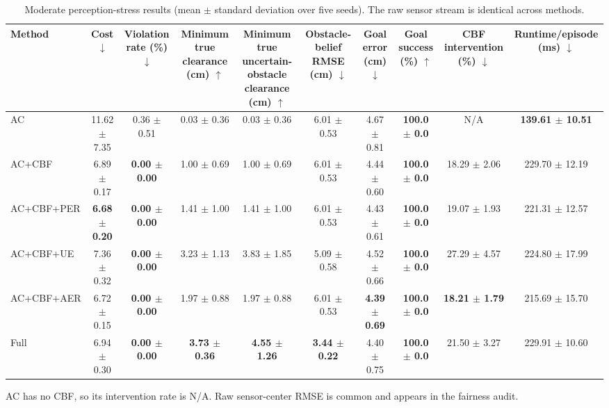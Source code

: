 \begin{table}[t]
\centering
\caption{Moderate perception-stress results (mean $\pm$ standard deviation over five seeds). The raw sensor stream is identical across methods.}
\label{tab:v17_1_moderate_results}
\begin{tabular}{lccccccccc}
\toprule
Method & Cost $\downarrow$ & Violation rate (\%) $\downarrow$ & Minimum true clearance (cm) $\uparrow$ & Minimum true uncertain-obstacle clearance (cm) $\uparrow$ & Obstacle-belief RMSE (cm) $\downarrow$ & Goal error (cm) $\downarrow$ & Goal success (\%) $\uparrow$ & CBF intervention (\%) $\downarrow$ & Runtime/episode (ms) $\downarrow$ \\
\midrule
AC & 11.62 $\pm$ 7.35 & 0.36 $\pm$ 0.51 & 0.03 $\pm$ 0.36 & 0.03 $\pm$ 0.36 & 6.01 $\pm$ 0.53 & 4.67 $\pm$ 0.81 & \textbf{100.0 $\pm$ 0.0} & N/A & \textbf{139.61 $\pm$ 10.51} \\
AC+CBF & 6.89 $\pm$ 0.17 & \textbf{0.00 $\pm$ 0.00} & 1.00 $\pm$ 0.69 & 1.00 $\pm$ 0.69 & 6.01 $\pm$ 0.53 & 4.44 $\pm$ 0.60 & \textbf{100.0 $\pm$ 0.0} & 18.29 $\pm$ 2.06 & 229.70 $\pm$ 12.19 \\
AC+CBF+PER & \textbf{6.68 $\pm$ 0.20} & \textbf{0.00 $\pm$ 0.00} & 1.41 $\pm$ 1.00 & 1.41 $\pm$ 1.00 & 6.01 $\pm$ 0.53 & 4.43 $\pm$ 0.61 & \textbf{100.0 $\pm$ 0.0} & 19.07 $\pm$ 1.93 & 221.31 $\pm$ 12.57 \\
AC+CBF+UE & 7.36 $\pm$ 0.32 & \textbf{0.00 $\pm$ 0.00} & 3.23 $\pm$ 1.13 & 3.83 $\pm$ 1.85 & 5.09 $\pm$ 0.58 & 4.52 $\pm$ 0.66 & \textbf{100.0 $\pm$ 0.0} & 27.29 $\pm$ 4.57 & 224.80 $\pm$ 17.99 \\
AC+CBF+AER & 6.72 $\pm$ 0.15 & \textbf{0.00 $\pm$ 0.00} & 1.97 $\pm$ 0.88 & 1.97 $\pm$ 0.88 & 6.01 $\pm$ 0.53 & \textbf{4.39 $\pm$ 0.69} & \textbf{100.0 $\pm$ 0.0} & \textbf{18.21 $\pm$ 1.79} & 215.69 $\pm$ 15.70 \\
Full & 6.94 $\pm$ 0.30 & \textbf{0.00 $\pm$ 0.00} & \textbf{3.73 $\pm$ 0.36} & \textbf{4.55 $\pm$ 1.26} & \textbf{3.44 $\pm$ 0.22} & 4.40 $\pm$ 0.75 & \textbf{100.0 $\pm$ 0.0} & 21.50 $\pm$ 3.27 & 229.91 $\pm$ 10.60 \\
\bottomrule
\end{tabular}
\begin{minipage}{0.99\textwidth}\footnotesize\vspace{2pt}
AC has no CBF, so its intervention rate is N/A. Raw sensor-center RMSE is common and appears in the fairness audit.
\end{minipage}
\end{table}